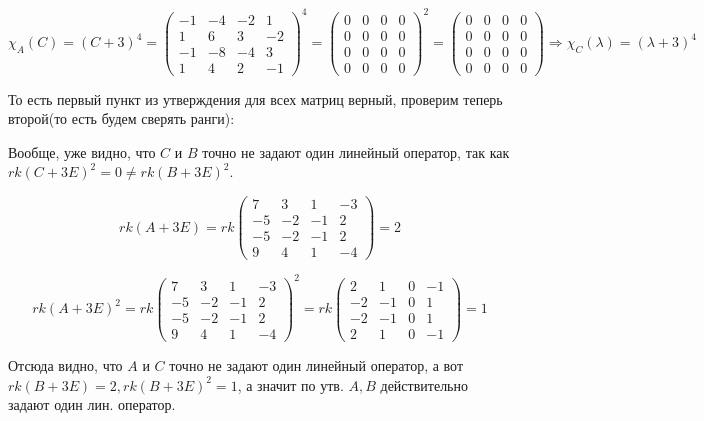 \documentclass[11pt]{article}
\begin{document}
$$
\chi_A(C) = (C + 3)^4 = 
\begin{pmatrix}
-1 & -4 & -2 & 1 \\
1 & 6 & 3 & -2 \\
-1 & -8 & -4 & 3 \\
1 & 4 & 2 & -1
\end{pmatrix}^4 =
\begin{pmatrix}
0 & 0 & 0 & 0 \\
0 & 0 & 0 & 0 \\
0 & 0 & 0 & 0 \\
0 & 0 & 0 & 0
\end{pmatrix}^2 = 
\begin{pmatrix}
0 & 0 & 0 & 0 \\
0 & 0 & 0 & 0 \\
0 & 0 & 0 & 0 \\
0 & 0 & 0 & 0
\end{pmatrix} \Rightarrow \chi_C(\lambda) = (\lambda + 3)^4
$$

То есть первый пункт из утверждения для всех матриц верный, проверим теперь второй(то есть будем сверять ранги):

Вообще, уже видно, что $C$ и $B$ точно не задают один линейный оператор, так как $rk(C + 3E)^2 = 0 \neq rk(B + 3E)^2$.

$$
rk(A + 3E) = rk
\begin{pmatrix}
7 & 3 & 1 & -3 \\
-5 & -2 & -1 & 2 \\
-5 & -2 & -1 & 2 \\
9 & 4 & 1 & -4
\end{pmatrix} = 2
$$

$$
rk(A + 3E)^2 = rk
\begin{pmatrix}
7 & 3 & 1 & -3 \\
-5 & -2 & -1 & 2 \\
-5 & -2 & -1 & 2 \\
9 & 4 & 1 & -4
\end{pmatrix}^2 = rk
\begin{pmatrix}
2 & 1 & 0 & -1 \\
-2 & -1 & 0 & 1 \\
-2 & -1 & 0 & 1 \\
2 & 1 & 0 & -1
\end{pmatrix} = 1
$$

Отсюда видно, что $A$ и $C$ точно не задают один линейный оператор, а вот $rk(B + 3E) = 2, rk(B + 3E)^2 = 1$, а значит по утв. $A, B$ действительно задают один лин. оператор.
\end{document}
